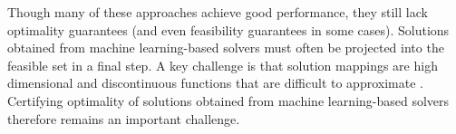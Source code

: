 \documentclass[10pt]{article} %
\theoremstyle{plain}
\theoremstyle{definition}
\theoremstyle{remark}
\begin{document}

Though many of these approaches achieve good performance, they still lack optimality guarantees (and even feasibility guarantees in some cases). Solutions obtained from machine learning-based solvers must often be projected into the feasible set in a final step. A key challenge is that solution mappings are high dimensional and discontinuous functions that are difficult to approximate \citep{pan2022deepopf}. Certifying optimality of solutions obtained from machine learning-based solvers therefore remains an important challenge.
\end{document}
